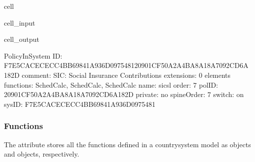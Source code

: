 \documentclass[letterpaper,10pt,english]{sphinxmanual}
\begin{document}
\begin{sphinxuseclass}{cell}
\begin{sphinxuseclass}{cell_input}
\begin{sphinxVerbatim}[commandchars=\\\{\}]
\PYG{p}{[}\PYG{p}{]}\PYG{p}{[}\PYG{p}{]}\PYG{p}{[}\PYG{p}{]}
\end{sphinxVerbatim}

\end{sphinxuseclass}
\begin{sphinxuseclass}{cell_output}
\begin{sphinxVerbatim}[commandchars=\\\{\}]
\PYGZhy{}\PYGZhy{}\PYGZhy{}\PYGZhy{}\PYGZhy{}\PYGZhy{}\PYGZhy{}\PYGZhy{}\PYGZhy{}\PYGZhy{}\PYGZhy{}\PYGZhy{}\PYGZhy{}\PYGZhy{}\PYGZhy{}\PYGZhy{}\PYGZhy{}\PYGZhy{}\PYGZhy{}\PYGZhy{}\PYGZhy{}\PYGZhy{}\PYGZhy{}\PYGZhy{}\PYGZhy{}\PYGZhy{}\PYGZhy{}\PYGZhy{}\PYGZhy{}\PYGZhy{}
PolicyInSystem
\PYGZhy{}\PYGZhy{}\PYGZhy{}\PYGZhy{}\PYGZhy{}\PYGZhy{}\PYGZhy{}\PYGZhy{}\PYGZhy{}\PYGZhy{}\PYGZhy{}\PYGZhy{}\PYGZhy{}\PYGZhy{}\PYGZhy{}\PYGZhy{}\PYGZhy{}\PYGZhy{}\PYGZhy{}\PYGZhy{}\PYGZhy{}\PYGZhy{}\PYGZhy{}\PYGZhy{}\PYGZhy{}\PYGZhy{}\PYGZhy{}\PYGZhy{}\PYGZhy{}\PYGZhy{}
	 ID: \PYGZsq{}F7E5CACE\PYGZhy{}CECC\PYGZhy{}4BB6\PYGZhy{}9841\PYGZhy{}A936D097548120901CF5\PYGZhy{}0A2A\PYGZhy{}4BA8\PYGZhy{}A18A\PYGZhy{}7092CD6A182D\PYGZsq{}
	 comment: \PYGZsq{}SIC: Social Insurance Contributions\PYGZsq{}
	 extensions: 0 elements
	 functions: SchedCalc, SchedCalc, SchedCalc
	 name: \PYGZsq{}sic\PYGZus{}sl\PYGZsq{}
	 order: \PYGZsq{}7\PYGZsq{}
	 polID: \PYGZsq{}20901CF5\PYGZhy{}0A2A\PYGZhy{}4BA8\PYGZhy{}A18A\PYGZhy{}7092CD6A182D\PYGZsq{}
	 private: \PYGZsq{}no\PYGZsq{}
	 spineOrder: \PYGZsq{}7\PYGZsq{}
	 switch: \PYGZsq{}on\PYGZsq{}
	 sysID: \PYGZsq{}F7E5CACE\PYGZhy{}CECC\PYGZhy{}4BB6\PYGZhy{}9841\PYGZhy{}A936D0975481\PYGZsq{}
\end{sphinxVerbatim}

\end{sphinxuseclass}
\end{sphinxuseclass}

\subsubsection{Functions}
\label{\detokenize{getstarted:functions}}
\sphinxAtStartPar
The attribute  stores all the functions defined in a country\sphinxhyphen{}system model as  objects and  objects, respectively.
\end{document}
